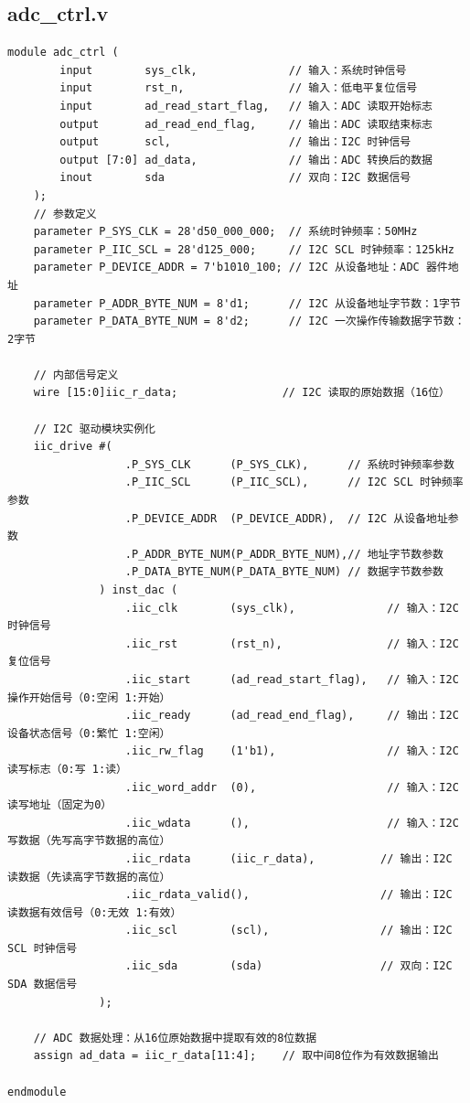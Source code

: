 \documentclass[a4paper,10pt]{article}
\begin{document}
\subsection{adc_ctrl.v}
\begin{lstlisting}[caption=adc_ctrl.v]
module adc_ctrl (
        input        sys_clk,              // 输入：系统时钟信号
        input        rst_n,                // 输入：低电平复位信号
        input        ad_read_start_flag,   // 输入：ADC 读取开始标志
        output       ad_read_end_flag,     // 输出：ADC 读取结束标志
        output       scl,                  // 输出：I2C 时钟信号
        output [7:0] ad_data,              // 输出：ADC 转换后的数据
        inout        sda                   // 双向：I2C 数据信号
    );
    // 参数定义
    parameter P_SYS_CLK = 28'd50_000_000;  // 系统时钟频率：50MHz
    parameter P_IIC_SCL = 28'd125_000;     // I2C SCL 时钟频率：125kHz
    parameter P_DEVICE_ADDR = 7'b1010_100; // I2C 从设备地址：ADC 器件地址
    parameter P_ADDR_BYTE_NUM = 8'd1;      // I2C 从设备地址字节数：1字节
    parameter P_DATA_BYTE_NUM = 8'd2;      // I2C 一次操作传输数据字节数：2字节

    // 内部信号定义
    wire [15:0]iic_r_data;                // I2C 读取的原始数据（16位）

    // I2C 驱动模块实例化
    iic_drive #(
                  .P_SYS_CLK      (P_SYS_CLK),      // 系统时钟频率参数
                  .P_IIC_SCL      (P_IIC_SCL),      // I2C SCL 时钟频率参数
                  .P_DEVICE_ADDR  (P_DEVICE_ADDR),  // I2C 从设备地址参数
                  .P_ADDR_BYTE_NUM(P_ADDR_BYTE_NUM),// 地址字节数参数
                  .P_DATA_BYTE_NUM(P_DATA_BYTE_NUM) // 数据字节数参数
              ) inst_dac (
                  .iic_clk        (sys_clk),              // 输入：I2C 时钟信号
                  .iic_rst        (rst_n),                // 输入：I2C 复位信号
                  .iic_start      (ad_read_start_flag),   // 输入：I2C 操作开始信号（0:空闲 1:开始）
                  .iic_ready      (ad_read_end_flag),     // 输出：I2C 设备状态信号（0:繁忙 1:空闲）
                  .iic_rw_flag    (1'b1),                 // 输入：I2C 读写标志（0:写 1:读）
                  .iic_word_addr  (0),                    // 输入：I2C 读写地址（固定为0）
                  .iic_wdata      (),                     // 输入：I2C 写数据（先写高字节数据的高位）
                  .iic_rdata      (iic_r_data),          // 输出：I2C 读数据（先读高字节数据的高位）
                  .iic_rdata_valid(),                    // 输出：I2C 读数据有效信号（0:无效 1:有效）
                  .iic_scl        (scl),                 // 输出：I2C SCL 时钟信号
                  .iic_sda        (sda)                  // 双向：I2C SDA 数据信号
              );

    // ADC 数据处理：从16位原始数据中提取有效的8位数据
    assign ad_data = iic_r_data[11:4];    // 取中间8位作为有效数据输出

endmodule

\end{lstlisting}
\end{document}
